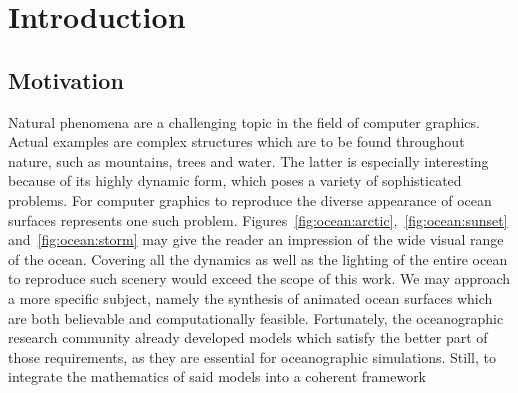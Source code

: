 \chapter{Introduction}
\label{ch:intro}
%
\section{Motivation}
\label{sec:motivation}
Natural phenomena are a challenging topic in the field of computer graphics.
Actual examples are complex structures which are to be found throughout nature,
such as mountains, trees and water. The latter is especially interesting
because of its highly dynamic form, which poses a variety of sophisticated problems.
For computer graphics to reproduce the diverse appearance of ocean surfaces
represents one such problem.
Figures~\ref{fig:ocean:arctic},~\ref{fig:ocean:sunset} and~\ref{fig:ocean:storm}
may give the reader an impression of the wide visual range of the ocean.
Covering all the dynamics as well as the lighting of the entire ocean to
reproduce such scenery would exceed the scope of this work.
We may approach a more specific subject, namely the synthesis of animated ocean
surfaces which are both believable and computationally feasible.
Fortunately, the oceanographic research community already developed models
which satisfy the better part of those requirements, as they are essential for
oceanographic simulations.
Still, to integrate the mathematics of said models into a coherent framework
